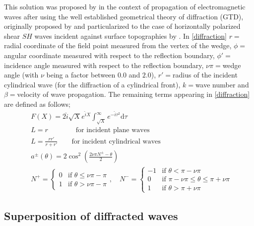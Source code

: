 \documentclass[11pt,letterpaper]{article}
\begin{document}
This solution was proposed by \cite{[1974]KoyPat} in the context of propagation of electromagnetic waves after using the well established geometrical theory of diffraction (GTD), originally proposed by \cite{[1962]Kell} and particularized to the case of horizontally polarized shear $SH$ waves incident against surface topographies by \cite{jaramillo2013analytic}. In \cref{diffraction} $r=$radial coordinate of the field point measured from the vertex of the wedge, $\phi=$ angular coordinate measured with respect to the reflection boundary, $\phi'=$incidence angle measured with respect to the reflection boundary, $\nu\pi=$wedge angle (with $\nu$ being a factor between $0.0$ and $2.0$), $r'=$radius of the incident cylindrical wave (for the diffraction of a cylindrical front), $k=$wave number and $\beta=$velocity of wave propagation.  The remaining terms appearing in \cref{diffraction} are defined as follows;
%
%
\begin{align*}
&F\left(X\right)=2\hat{i}\sqrt{X}e^{\hat{i}X}
\int_{\sqrt{X}}^\infty e^{-\hat{i}\tau^2}\mathrm{d}\tau\\
&L=r\qquad\qquad\text{for incident plane waves}\\
&L=\frac{rr'}{r+r'}\qquad\text{for incident cylindrical waves}\\
&a^{\pm}\left(\theta\right)=2\cos ^{2}\left(\frac{2\nu\pi N^\pm -\theta}{2}\right)\\
&N^+ =
  \begin{cases}
   0 & \text{if } \theta \leq \nu\pi -\pi \\
   1       & \text{if } \theta > \nu\pi -\pi
  \end{cases},\quad N^-=\begin{cases}
  -1 & \text{if } \theta < \pi -\nu\pi \\
   0 & \text{if } \pi -\nu\pi\leq \theta \leq \pi +\nu\pi \\
   1 & \text{if } \theta > \pi +\nu\pi
  \end{cases}
\end{align*}



\subsection*{Superposition of diffracted waves}
{}
\end{document}
